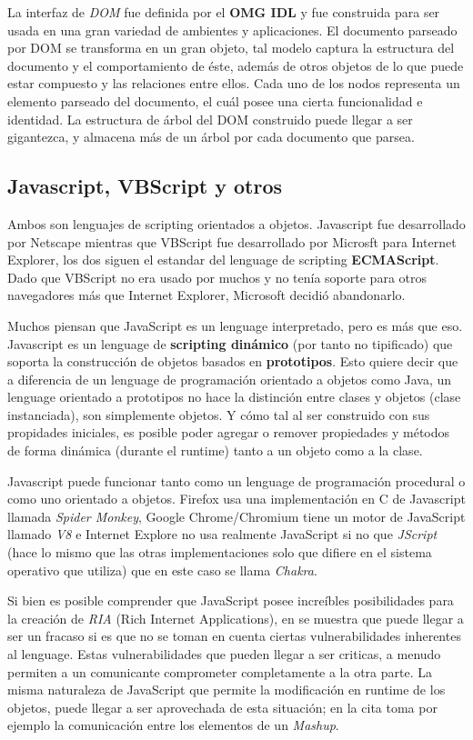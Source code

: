     La interfaz de \textit{DOM} fue definida por el \textbf{OMG IDL} y fue construida para ser usada en una gran variedad de ambientes y aplicaciones. El documento parseado por DOM se transforma en un gran objeto, tal modelo captura la estructura del documento y el comportamiento de éste, además de otros objetos de lo que puede estar compuesto y las relaciones entre ellos. Cada uno de los nodos representa un elemento parseado del documento, el cuál posee una cierta funcionalidad e identidad. La estructura de árbol del DOM construido puede llegar a ser gigantezca, y almacena más de un árbol por cada documento que parsea. 
            
    \subsection{Javascript, VBScript y otros}
    \label{chap2:JS}
    Ambos son lenguajes de scripting orientados a objetos. Javascript fue desarrollado por Netscape mientras que VBScript fue desarrollado por Microsft para Internet Explorer, los dos siguen el estandar del lenguage de scripting \textbf{ECMAScript}. Dado que VBScript no era usado por muchos y no tenía soporte para otros navegadores más que Internet Explorer, Microsoft decidió abandonarlo.

    Muchos piensan que JavaScript es un lenguage interpretado, pero es más que eso. Javascript es un lenguage de \textbf{scripting dinámico} (por tanto no tipificado) que soporta la construcción de objetos basados en \textbf{prototipos}. Esto quiere decir que a diferencia de un lenguage de programación orientado a objetos como Java, un lenguage orientado a prototipos no hace la distinción entre clases y objetos (clase instanciada), son simplemente objetos. Y cómo tal al ser construido con sus propidades iniciales, es posible poder agregar o remover propiedades y métodos de forma dinámica (durante el runtime) tanto a un objeto como a la clase.
            
    Javascript puede funcionar tanto como un lenguage de programación procedural o como uno orientado a objetos. Firefox usa una implementación en C de Javascript llamada \textit{Spider Monkey}, Google Chrome/Chromium tiene un motor de JavaScript llamado \textit{V8} e Internet Explore no usa realmente JavaScript si no que \textit{JScript} (hace lo mismo que las otras implementaciones solo que difiere en el sistema operativo que utiliza) que en este caso se llama \textit{Chakra}.
            
    Si bien es posible comprender que JavaScript posee increíbles posibilidades para la creación de \textit{RIA} (Rich Internet Applications), en \cite{barth2009attacks} se muestra que puede llegar a ser un fracaso si es que no se toman en cuenta ciertas vulnerabilidades inherentes al lenguage. Estas vulnerabilidades que pueden llegar a ser criticas, a menudo permiten a un comunicante comprometer completamente a la otra parte. La misma naturaleza de JavaScript que permite la modificación en runtime de los objetos, puede llegar a ser aprovechada de esta situación; en la cita toma por ejemplo la comunicación entre los elementos de un \textit{Mashup}.


